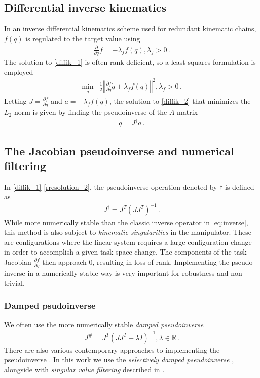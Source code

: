 \documentclass[times, utf8, diplomski, english]{fer}
\begin{document}
\subsection{Differential inverse kinematics}
In an inverse differential kinematics scheme used for redundant kinematic chains, $f\left(q\right)$ is regulated to the target value using
\begin{align}
\label{diffik_1}
\frac{\partial}{\partial q}f = -\lambda_{f}f\left(q\right), \lambda_{f} > 0 \, .
\end{align}
The solution to \ref{diffik_1} is often rank-deficient, so a least squares formulation is employed
\begin{align}
\label{diffik_2}
\min\limits_{\dot{q}} & \frac{1}{2}\left\Vert\frac{\partial f}{\partial q} \dot{q} + \lambda_{f}f\left(q\right)\right\Vert^2, \lambda_{f} > 0 \, .
\end{align}
Letting $J = \frac{\partial f}{\partial q}$ and $a = -\lambda_{f}f\left(q\right)$, the solution to \ref{diffik_2} that minimizes the $L_{2}$ norm is given by finding the pseudoinverse of the $A$ matrix
\begin{align}
\label{diffik_4}
\dot{q} = J^{\dagger}a  \, .
\end{align}
\subsection{The Jacobian pseudoinverse and numerical filtering}
In \eqref{diffik_1}-\eqref{rresolution_2}, the pseudoinverse operation denoted by $\dagger$ is defined as 
\begin{align}
J^{\dagger} = J^T\left(JJ^T\right)^{-1}\, .
\end{align}
While more numerically stable than the classic inverse operator in \eqref{eq:inverse}, this method is also subject to \textit{kinematic singularities} in the manipulator.
These are configurations where the linear system requires a large configuration change in order to accomplish a given task space change.
The components of the task Jacobian $\frac{\partial f}{\partial q}$ then approach 0, resulting in loss of rank.
Implementing the pseudo-inverse in a numerically stable way is very important for robustness and non-trivial.
\subsubsection{Damped psudoinverse}
We often use the more numerically stable \textit{damped pseudoinverse} \citep{chan1988general}
\begin{align}
J^{\#} = J^T\left(JJ^T + \lambda I\right)^{-1} ,  \lambda \in \mathbb{R}\, .
\end{align}
There are also various contemporary approaches to implementing the pseudoinverse \citep{chiaverini1994review}. 
In this work we use the \textit{selectively damped pseudoinverse} \citep{buss2005selectively}, alongside with \textit{singular value filtering} described in \citep{colome2015closed}.
\end{document}
